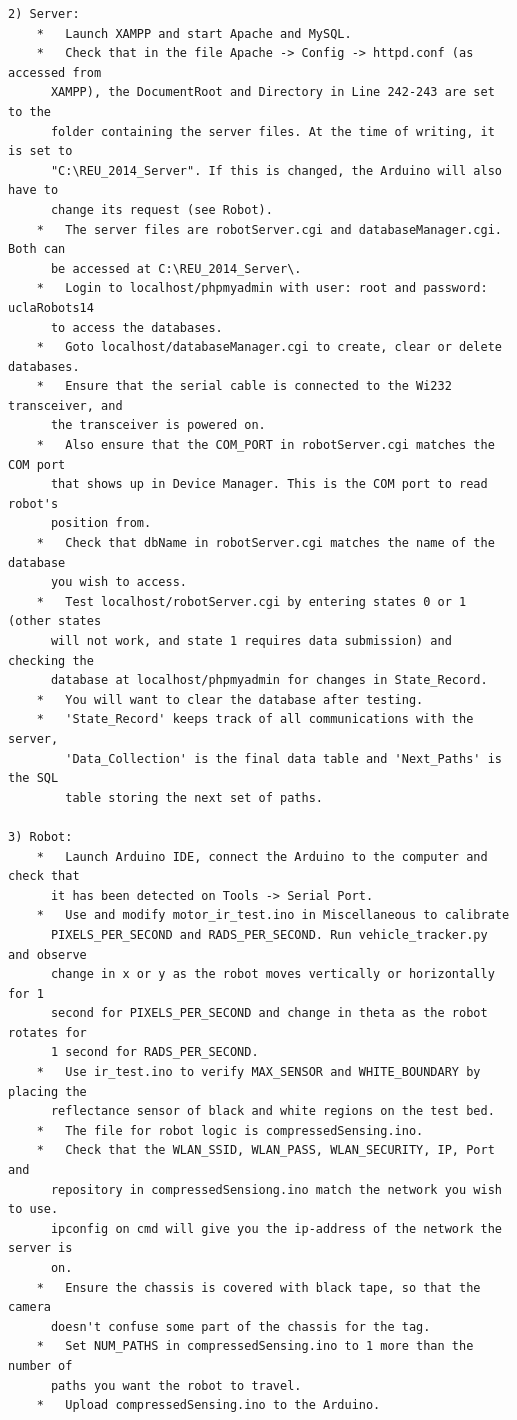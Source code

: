 \documentclass[english]{article}\usepackage[]{graphicx}\usepackage[]{color}
\begin{document}
\begin{verbatim}
2) Server:
	*   Launch XAMPP and start Apache and MySQL.
	*   Check that in the file Apache -> Config -> httpd.conf (as accessed from
	  XAMPP), the DocumentRoot and Directory in Line 242-243 are set to the
	  folder containing the server files. At the time of writing, it is set to
	  "C:\REU_2014_Server". If this is changed, the Arduino will also have to
	  change its request (see Robot).
	*   The server files are robotServer.cgi and databaseManager.cgi. Both can
	  be accessed at C:\REU_2014_Server\.
	*   Login to localhost/phpmyadmin with user: root and password: uclaRobots14
	  to access the databases.
	*   Goto localhost/databaseManager.cgi to create, clear or delete databases.
	*   Ensure that the serial cable is connected to the Wi232 transceiver, and
	  the transceiver is powered on.
	*   Also ensure that the COM_PORT in robotServer.cgi matches the COM port
	  that shows up in Device Manager. This is the COM port to read robot's
	  position from.
	*   Check that dbName in robotServer.cgi matches the name of the database
	  you wish to access.
	*   Test localhost/robotServer.cgi by entering states 0 or 1 (other states
	  will not work, and state 1 requires data submission) and checking the
	  database at localhost/phpmyadmin for changes in State_Record.
	*   You will want to clear the database after testing.
	*   'State_Record' keeps track of all communications with the server,
		'Data_Collection' is the final data table and 'Next_Paths' is the SQL
		table storing the next set of paths.

3) Robot:
	*   Launch Arduino IDE, connect the Arduino to the computer and check that
	  it has been detected on Tools -> Serial Port.
	*   Use and modify motor_ir_test.ino in Miscellaneous to calibrate
	  PIXELS_PER_SECOND and RADS_PER_SECOND. Run vehicle_tracker.py and observe
	  change in x or y as the robot moves vertically or horizontally for 1
	  second for PIXELS_PER_SECOND and change in theta as the robot rotates for
	  1 second for RADS_PER_SECOND.
	*   Use ir_test.ino to verify MAX_SENSOR and WHITE_BOUNDARY by placing the
	  reflectance sensor of black and white regions on the test bed.
	*   The file for robot logic is compressedSensing.ino.
	*	Check that the WLAN_SSID, WLAN_PASS, WLAN_SECURITY, IP, Port and 
	  repository in compressedSensiong.ino match the network you wish to use.
	  ipconfig on cmd will give you the ip-address of the network the server is
	  on.
	*   Ensure the chassis is covered with black tape, so that the camera
	  doesn't confuse some part of the chassis for the tag.
	*   Set NUM_PATHS in compressedSensing.ino to 1 more than the number of
	  paths you want the robot to travel.
	*   Upload compressedSensing.ino to the Arduino.



\end{verbatim}
\end{document}
